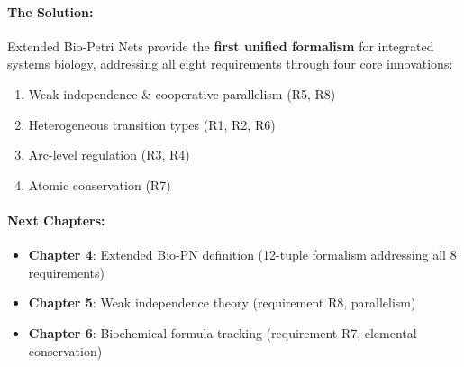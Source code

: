 \paragraph{The Solution:} Extended Bio-Petri Nets provide the \textbf{first unified formalism} for integrated systems biology, addressing all eight requirements through four core innovations:
\begin{enumerate}
    \item Weak independence \& cooperative parallelism (R5, R8)
    \item Heterogeneous transition types (R1, R2, R6)
    \item Arc-level regulation (R3, R4)
    \item Atomic conservation (R7)
\end{enumerate}

\paragraph{Next Chapters:}
\begin{itemize}
    \item \textbf{Chapter 4}: Extended Bio-PN definition (12-tuple formalism addressing all 8 requirements)
    \item \textbf{Chapter 5}: Weak independence theory (requirement R8, parallelism)
    \item \textbf{Chapter 6}: Biochemical formula tracking (requirement R7, elemental conservation)
\end{itemize}
